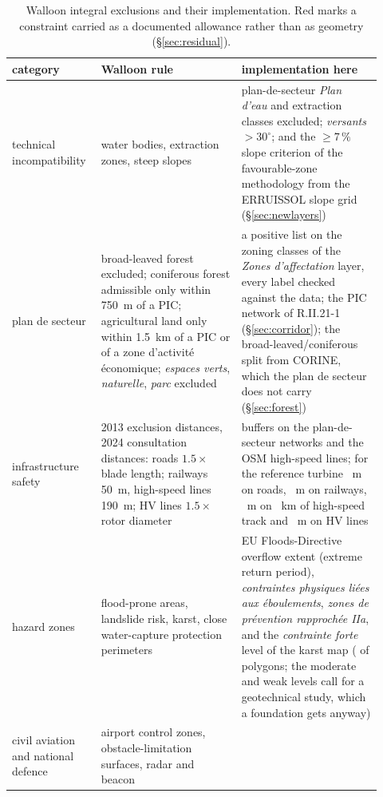\documentclass[11pt,a4paper]{article}
\begin{document}
\begin{table}[htbp]\centering\footnotesize
\caption{Walloon integral exclusions and their implementation.
\textcolor{warn}{Red} marks a constraint carried as a documented allowance
rather than as geometry (§\ref{sec:residual}).}
\label{tab:rules}
\begin{tabular}{p{0.20\linewidth}p{0.36\linewidth}p{0.36\linewidth}}
\toprule
category & Walloon rule & implementation here \\
\midrule
technical incompatibility
  & water bodies, extraction zones, steep slopes
  & plan-de-secteur \emph{Plan d'eau} and extraction classes excluded;
    \emph{versants $>30^\circ$}; and the $\geq 7\,\%$ slope criterion of the
    favourable-zone methodology from the ERRUISSOL slope grid
    (§\ref{sec:newlayers}) \\
plan de secteur
  & broad-leaved forest excluded; coniferous forest admissible only within
    \SI{750}{\metre} of a PIC; agricultural land only within
    \SI{1.5}{\kilo\metre} of a PIC or of a zone d'activité économique;
    \emph{espaces verts}, \emph{naturelle}, \emph{parc} excluded
  & a positive list on the zoning classes of the \emph{Zones d'affectation}
    layer, every label checked against the data; the PIC network of
    R.II.21-1 (§\ref{sec:corridor}); the broad-leaved/coniferous split from
    CORINE, which the plan de secteur does not carry (§\ref{sec:forest}) \\
infrastructure safety
  & 2013 exclusion distances, 2024 consultation distances: roads
    $1.5\times$ blade length; railways \SI{50}{\metre}, high-speed lines
    \SI{190}{\metre}; HV lines $1.5\times$ rotor diameter
  & buffers on the plan-de-secteur networks and the OSM high-speed lines; for
    the reference turbine \RoadSetback{}~m on roads, \RailSetback{}~m on
    railways, \HslSetback{}~m on \HslKm{}~km of high-speed track and
    \HvSetback{}~m on HV lines \\
hazard zones
  & flood-prone areas, landslide risk, karst, close water-capture protection
    perimeters
  & EU Floods-Directive overflow extent (extreme return period),
    \emph{contraintes physiques liées aux éboulements}, \emph{zones de
    prévention rapprochée IIa}, and the \emph{contrainte forte} level of the
    karst map (\KarstKept{} of \KarstTotal{} polygons; the moderate and weak
    levels call for a geotechnical study, which a foundation gets anyway) \\
civil aviation and national defence
  & airport control zones, obstacle-limitation surfaces, radar and beacon

\end{tabular}
\end{table}
\end{document}
